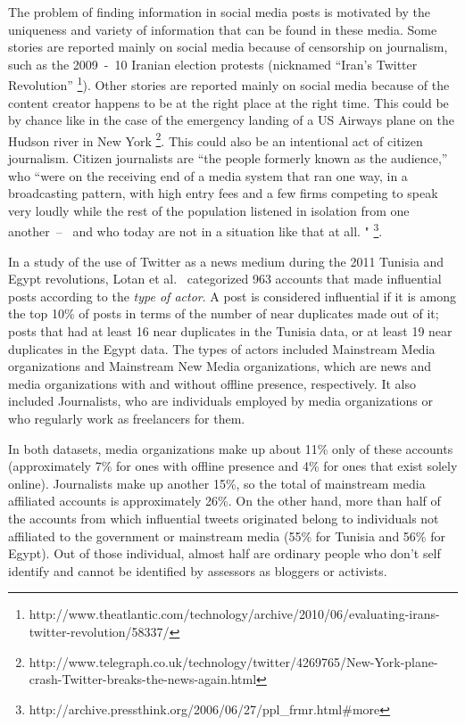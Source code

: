 \documentclass[letterpaper,12pt,titlepage,oneside,final]{book}
\begin{document}
The problem of finding information in social media posts 
is motivated by the uniqueness and variety of information that can be found
in these media. 
Some stories are reported mainly on social media 
because 
of censorship on journalism, 
such as the 2009~-~10 Iranian election protests 
(nicknamed ``Iran's Twitter Revolution''
\footnote{http://www.theatlantic.com/technology/archive/2010/06/evaluating-irans-twitter-revolution/58337/}).
Other stories are reported mainly on social media
because of the 
content creator happens to be at the right place
at the right time. 
This could be by chance like in the case of
the emergency landing of a US Airways plane 
on the Hudson river in New York
\footnote{http://www.telegraph.co.uk/technology/twitter/4269765/New-York-plane-crash-Twitter-breaks-the-news-again.html}.
This could also be an intentional act
of citizen journalism. 
Citizen journalists are ``the people formerly known as the audience,'' who ``were on the receiving end of a media system that ran one way, in a broadcasting pattern, with high entry fees and a few firms competing to speak very loudly while the rest of the population listened in isolation from one another~--~ and who today are not in a situation like that at all. "
\footnote{http://archive.pressthink.org/2006/06/27/ppl\_frmr.html\#more}.

In a study of the use of Twitter as a news medium during the 2011 Tunisia and Egypt revolutions, 
Lotan et al.~\cite{lotan2011revolutions}  categorized 963 accounts that made influential posts according to the \emph{type of actor}. 
A post is considered influential if it is among the top 10\% of posts in terms of the number of near duplicates made out of it; 
posts that had at least 16 near duplicates in the Tunisia data, or at least 19 near duplicates in the Egypt data.
The types of actors included Mainstream Media organizations and Mainstream New Media organizations, 
which are news and media organizations with and without offline presence, respectively.
It also included Journalists, who are individuals employed by media organizations or who 	regularly work as freelancers for them.

In both datasets, media organizations make up about 11\% only of these accounts (approximately 7\% for ones with offline presence and 4\% for ones that exist solely online). 
Journalists make up another 15\%, so the total of mainstream media affiliated accounts is approximately 26\%.
On the other hand, more than half of the accounts from which influential tweets originated belong to individuals not affiliated to the government or mainstream media (55\% for Tunisia and 56\% for Egypt). 
Out of those individual, almost half are ordinary people who don't self identify and cannot be identified by assessors as bloggers or activists. 
\end{document}
